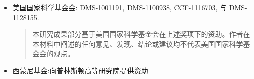 {\begin{itemize}
\item 美国国家科学基金会:
  \href{http://www.nsf.gov/awardsearch/showAward.do?AwardNumber=1001191}{DMS-1001191}, %
  \href{http://www.nsf.gov/awardsearch/showAward.do?AwardNumber=1100938}{DMS-1100938}, %
  \href{http://www.nsf.gov/awardsearch/showAward.do?AwardNumber=1116703}{CCF-1116703}, %
  与
  \href{http://www.nsf.gov/awardsearch/showAward.do?AwardNumber=1128155}{DMS-1128155}. %
  {
    \setlength{\itemsep}{0pt}
    \begin{quote}
      \noindent\scriptsize
      本研究成果部分基于美国国家科学基金会在上述奖项下的资助。作者在本材料中阐述的任何意见、发现、结论或建议均不代表美国国家科学基金会的观点。
    \end{quote}
  }
\item 西蒙尼基金:向普林斯顿高等研究院提供资助          %
  \end{itemize}


}
\cleartooddpage

